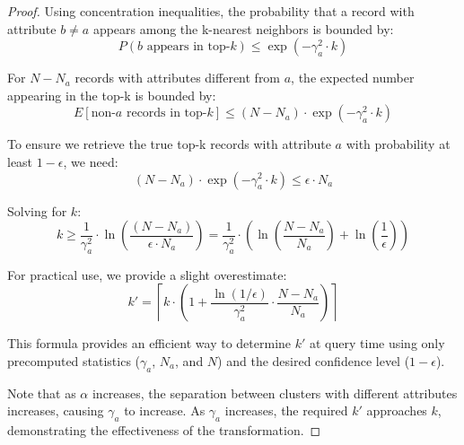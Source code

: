 \documentclass[numbers,sort]{article}
\begin{document}
\begin{proof}
Using concentration inequalities, the probability that a record with attribute $b \neq a$ appears among the k-nearest neighbors is bounded by:
\begin{equation}
P(b \text{ appears in top-}k) \leq \exp(-\gamma_a^2 \cdot k)
\end{equation}

For $N - N_a$ records with attributes different from $a$, the expected number appearing in the top-k is bounded by:
\begin{equation}
E[\text{non-}a \text{ records in top-}k] \leq (N - N_a) \cdot \exp(-\gamma_a^2 \cdot k)
\end{equation}

To ensure we retrieve the true top-k records with attribute $a$ with probability at least $1-\epsilon$, we need:
\begin{equation}
(N - N_a) \cdot \exp(-\gamma_a^2 \cdot k) \leq \epsilon \cdot N_a
\end{equation}

Solving for $k$:
\begin{equation}
k \geq \frac{1}{\gamma_a^2} \cdot \ln\left(\frac{(N - N_a)}{\epsilon \cdot N_a}\right) = \frac{1}{\gamma_a^2} \cdot \left(\ln\left(\frac{N - N_a}{N_a}\right) + \ln\left(\frac{1}{\epsilon}\right)\right)
\end{equation}

For practical use, we provide a slight overestimate:
\begin{equation}
k' = \left\lceil k \cdot \left(1 + \frac{\ln(1/\epsilon)}{\gamma_a^2} \cdot \frac{N - N_a}{N_a}\right) \right\rceil
\end{equation}

This formula provides an efficient way to determine $k'$ at query time using only precomputed statistics ($\gamma_a$, $N_a$, and $N$) and the desired confidence level ($1-\epsilon$).

Note that as $\alpha$ increases, the separation between clusters with different attributes increases, causing $\gamma_a$ to increase. As $\gamma_a$ increases, the required $k'$ approaches $k$, demonstrating the effectiveness of the transformation.
\end{proof}
\end{document}
